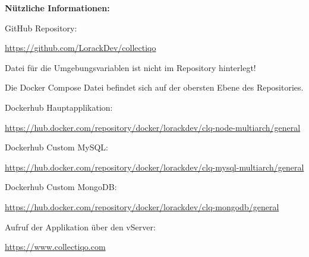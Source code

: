 \textbf{Nützliche Informationen:}\par
\vspace{0.5cm}
GitHub Repository:\par
\url{https://github.com/LorackDev/collectiqo}\par
Datei für die Umgebungsvariablen ist nicht im Repository hinterlegt!\par
Die Docker Compose Datei befindet sich auf der obersten Ebene des Repositories.\par

\vspace{0.5cm}
Dockerhub Hauptapplikation:\par
\url{https://hub.docker.com/repository/docker/lorackdev/clq-node-multiarch/general}\par
Dockerhub Custom MySQL:\par
\url{https://hub.docker.com/repository/docker/lorackdev/clq-mysql-multiarch/general}\par
Dockerhub Custom MongoDB:\par
\url{https://hub.docker.com/repository/docker/lorackdev/clq-mongodb/general}\par

\vspace{0.5cm}
Aufruf der Applikation über den vServer:\par
\url{https://www.collectiqo.com}\par